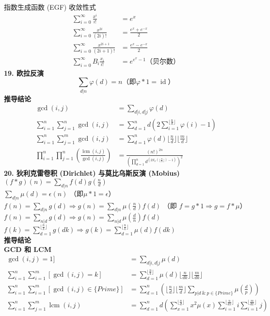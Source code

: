 指数生成函数 (EGF) 收敛性式
$$
\begin{aligned}
\sum_{i=0}^{\infty}\frac{x^i}{i!}&=e^x\\
\sum_{i=0}^{\infty}\frac{x^{2i}}{(2i)!}&=\frac{e^x+e^{-x}}{2}\\
\sum_{i=0}^{\infty}\frac{x^{2i+1}}{(2i+1)!}&=\frac{e^x-e^{-x}}{2}\\
\sum_{i=0}^{\infty}B_{i}\frac{x_{i}}{i!}&=e^{e^{x}-1}（贝尔数）
\end{aligned}
$$
\textbf{19. 欧拉反演}\\
$$\sum_{d|n}\varphi(d)=n （即 \varphi\ast 1=\operatorname{id}）$$
\textbf{推导结论}
$$
\begin{aligned}
\gcd(i,j)&=\sum_{d|i,d|j} \varphi(d)\\
\sum_{i=1}^{n} \sum_{j=1}^{n} \gcd(i,j)&= \sum_{d=1}^{n}d\left(2\sum_{i=1}^{\lfloor\frac{n}{d}\rfloor}{\varphi(i)}-1\right)\\
\sum_{i=1}^{n} \sum_{j=1}^{m} \gcd(i,j)&= \sum_{d=1}^{n} \varphi(d) \lfloor\frac{n}{d}\rfloor \lfloor\frac{m}{d}\rfloor\\
\prod_{i=1}^{n} \prod_{j=1}^{n} \left(\frac{\operatorname{lcm}(i,j)}{\gcd(i,j)}\right)&= \frac{(n!)^{2n}}{\left(\prod_{d=1}^{n} d^{\left(2 S_{\varphi}(\lfloor\frac{n}{a}\rfloor)-1\right)}\right)^{2}}
\end{aligned}
$$
\textbf{20. 狄利克雷卷积 (Dirichlet) 与莫比乌斯反演 (Mobius)} \\
$(f \ast g)(n)=\sum_{d | n} f(d) g(\frac{n}{d})$\\
$\sum_{d|n} \mu(d)=\epsilon(n)$ （即$ \mu\ast1=\epsilon$）\\
$f(n)=\sum_{d | n} g(d) \Longrightarrow g(n)=\sum_{d | n} \mu(\frac{n}{d}) f(d)$ （即 $f=g\ast1 \Longrightarrow g=f\ast\mu$）\\
$f(n)=\sum_{n | d} g(d) \Longrightarrow g(n)=\sum_{n | d} \mu(\frac{d}{n}) f(d)$\\
$f(k)=\sum_{d=1}^{\lfloor\frac{n}{k}\rfloor} g(dk) \Longrightarrow g(k)=\sum_{d=1}^{\lfloor\frac{n}{k}\rfloor} \mu(d) f(dk)$\\
\textbf{推导结论}\\
\textbf{GCD 和 LCM}
$$
\begin{aligned}
    \gcd(i,j)=1]&=\sum_{d|i,d|j} \mu(d)\\
    \sum_{i=1}^{n}\sum_{i=1}^{m}[\gcd(i,j)=k]&= \sum_{d=1}^{\lfloor\frac{n}{k}\rfloor} \mu(d)\lfloor\frac{n}{d k}\rfloor\lfloor\frac{m}{d k}\rfloor \\
    \sum_{i=1}^{n}\sum_{i=1}^{m}[\gcd(i,j)\in \{Prime\}]&= \sum_{d=1}^{n}\left(\lfloor\frac{n}{d}\rfloor\lfloor\frac{m}{d}\rfloor\sum_{p | d\ \&\ p\in\{Prime\}} \mu(\frac{d}{p})\right)\\
    \sum_{i=1}^{n} \sum_{j=1}^{m} \operatorname{lcm}(i,j)&= \sum_{d=1}^{n} d\left(\sum_{x=1}^{\lfloor\frac{n}{d}\rfloor} x^{2} \mu(x) \sum_{i=1}^{\lfloor\frac{n}{dx}\rfloor} i\sum_{i=1}^{\lfloor\frac{m}{dx}\rfloor} j \right)
\end{aligned}
$$
